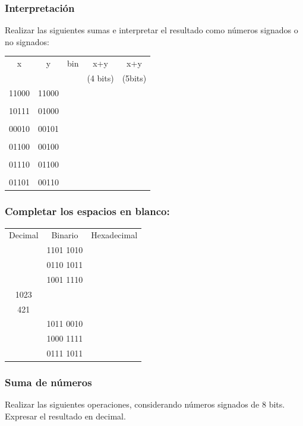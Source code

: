 \subsubsection{Interpretación}
Realizar las siguientes sumas e interpretar el resultado como números signados o no signados:\\

\begin{tabular}{ccccc}
x&y&bin&x+y&x+y\\
&&&(4 bits)&(5bits)\\
11000&11000&\underspace&\underspace&\underspace\\
&&&&\\
10111&01000&\underspace&\underspace&\underspace\\
&&&&\\
00010&00101&\underspace&\underspace&\underspace\\
&&&&\\
01100&00100&\underspace&\underspace&\underspace\\
&&&&\\
01110&01100&\underspace&\underspace&\underspace\\
&&&&\\
01101&00110&\underspace&\underspace&\underspace\\
\end{tabular}


\subsubsection{Completar los espacios en blanco:}
\begin{tabular}{ccc}
  Decimal&Binario&Hexadecimal\\
  \underspace&1101 1010&\underspace \\
  \underspace&0110 1011&\underspace \\
  \underspace&1001 1110&\underspace \\
  1023& &\underspace\\
  421&\underspace &\underspace \\
  \underspace&1011 0010&\underspace \\
  \underspace&1000 1111&\underspace \\
  \underspace&0111 1011&\underspace \\
\end{tabular}

\subsubsection{Suma de números}
Realizar las siguientes operaciones, considerando números signados de 8 bits. Expresar el resultado en decimal.
\vspace{10mm}

